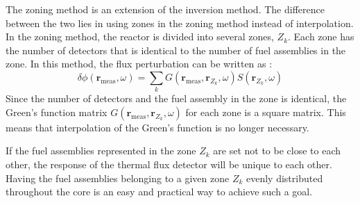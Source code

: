 The zoning method is an extension of the inversion method. The difference between the two lies in using zones in the zoning method instead of interpolation. In the zoning method, the reactor is divided into several zones, $Z_k$. Each zone has the number of detectors that is identical to the number of fuel assemblies in the zone. In this method, the flux perturbation can be written as \cite{demaziereIdentificationLocalizationAbsorbers2005}:
\begin{equation}
    \delta \phi (\textbf{r}_{\text{meas}}, \omega) = \sum_k G(\textbf{r}_{\text{meas}}, \textbf{r}_{Z_k},\omega) S(\textbf{r}_{Z_k},\omega)
\end{equation}
Since the number of detectors and the fuel assembly in the zone is identical, the Green’s function matrix $G(\textbf{r}_{\text{meas}}, \textbf{r}_{Z_k},\omega)$ for each zone is a square matrix. This means that interpolation of the Green’s function is no longer necessary.

If the fuel assemblies represented in the zone $Z_k$ are set not to be close to each other, the response of the thermal flux detector will be unique to each other. Having the fuel assemblies belonging to a given zone $Z_k$ evenly distributed throughout the core is an easy and practical way to achieve such a goal.

